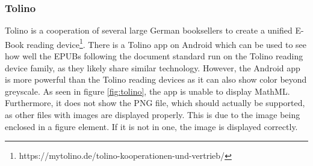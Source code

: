 \subsubsection{Tolino}
Tolino is a cooperation of several large German booksellers to create a unified E-Book reading device\footnote{https://mytolino.de/tolino-kooperationen-und-vertrieb/}. There is a Tolino app on Android which can be used to see how well the EPUBs following the document standard run on the Tolino reading device family, as they likely share similar technology. However, the Android app is more powerful than the Tolino reading devices as it can also show color beyond greyscale. As seen in figure \ref{fig:tolino}, the app is unable to display MathML. Furthermore, it does not show the PNG file, which should actually be supported, as other files with images are displayed properly. This is due to the image being enclosed in a figure element. If it is not in one, the image is displayed correctly. 

